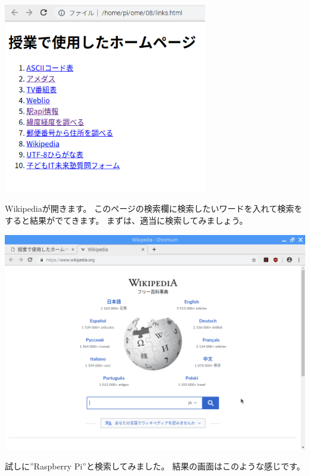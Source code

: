 \documentclass[a4paper,12pt,dvipdfmx]{jarticle}
\begin{document}
\begin{center}
\includegraphics[width=8.881cm]{textbook-img017.png}

\end{center}

\bigskip


\bigskip

Wikipediaが開きます。
このページの検索欄に検索したいワードを入れて検索をすると結果がでてきます。
まずは、適当に検索してみましょう。



\begin{center}
\includegraphics[width=16.007cm]{textbook-img058.png}

\end{center}
\clearpage
試しに”Raspberry
Pi”と検索してみました。
結果の画面はこのような感じです。
\end{document}
